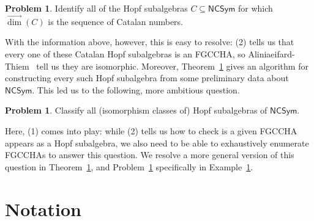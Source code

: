 \documentclass[11pt]{amsart}
\theoremstyle{definition}
\newtheorem{problem}[theorem]{Problem}
\numberwithin{equation}{section}
\newcommand{\FGCCHA}{\textsf{FGCCHA}\xspace}
\newcommand{\FGCCHAs}{\textsf{FGCCHA}s\xspace}
\newcommand{\vecdim}{\overrightarrow{\dim}}
\begin{document}
\begin{problem}
\label{prob1}
Identify all of the Hopf subalgebras $C \subseteq \mathsf{NCSym}$ for which $\vecdim(C)$ is the sequence of Catalan numbers.
\end{problem}

With the information above, however, this is easy to resolve:
(2) tells us that every one of these Catalan Hopf subalgebras is an \FGCCHA,
so Aliniaeifard-Thiem~\cite{AT20} tell us they are isomorphic.
Moreover, Theorem~\ref{} gives an algorithm for constructing
every such Hopf subalgebra from some preliminary data about $\mathsf{NCSym}$.
This led us to the following, more ambitious question.

\begin{problem}
\label{prob2}
Classify all (isomorphism classes of) Hopf subalgebras of $\mathsf{NCSym}$.
\end{problem}

Here, (1) comes into play: while (2) tells us how to check is a given \FGCCHA appears as a Hopf subalgebra, we also need to be able to exhaustively enumerate \FGCCHAs to answer this question.
We resolve a more general version of this question in Theorem~\ref{}, and Problem~\ref{prob2} specifically in Example~\ref{}.  

%
%
%
%
%

\section{Notation}
\end{document}

